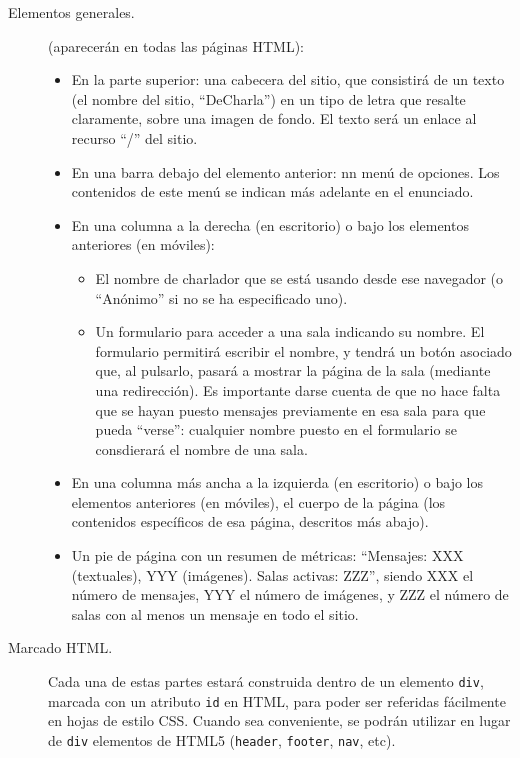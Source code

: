 \begin{description}
\item[Elementos generales.] (aparecerán en todas las páginas HTML):
  \begin{itemize}
  \item En la parte superior: una cabecera del sitio, que consistirá de un texto (el nombre del sitio, ``DeCharla'') en un tipo de letra que resalte claramente, sobre una imagen de fondo. El texto será un enlace al recurso ``/'' del sitio.
  \item En una barra debajo del elemento anterior: nn menú de opciones. Los contenidos de este menú se indican más adelante en el enunciado.
  \item En una columna a la derecha (en escritorio) o bajo los elementos anteriores (en móviles):
    \begin{itemize}
    \item El nombre de charlador que se está usando desde ese navegador (o ``Anónimo'' si no se ha especificado uno).
    \item Un formulario para acceder a una sala indicando su nombre. El formulario permitirá escribir el nombre, y tendrá un botón asociado que, al pulsarlo, pasará a mostrar la página de la sala (mediante una redirección). Es importante darse cuenta de que no hace falta que se hayan puesto mensajes previamente en esa sala para que pueda ``verse'': cualquier nombre puesto en el formulario se consdierará el nombre de una sala.
    \end{itemize}
  \item En una columna más ancha a la izquierda (en escritorio) o bajo los elementos anteriores (en móviles), el cuerpo de la página (los contenidos específicos de esa página, descritos más abajo).
  \item Un pie de página con un resumen de métricas: ``Mensajes: XXX (textuales), YYY (imágenes). Salas activas: ZZZ'', siendo XXX el número de mensajes, YYY el número de imágenes, y ZZZ el número de salas con al menos un mensaje en todo el sitio.
  \end{itemize}

\item[Marcado HTML.] Cada una de estas partes estará construida dentro de un elemento \texttt{div}, marcada con un atributo \texttt{id} en HTML, para poder ser referidas fácilmente en hojas de estilo CSS. Cuando sea conveniente, se podrán utilizar en lugar de \texttt{div} elementos de HTML5 (\texttt{header}, \texttt{footer}, \texttt{nav}, etc).
  

\end{description}
